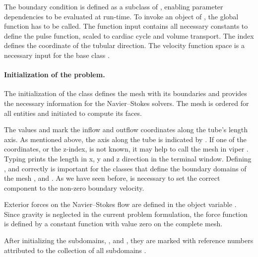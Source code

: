 The boundary condition  is defined as a subclass of
, enabling parameter dependencies to be evaluated at run-time. To invoke an object of , the global function
 has to be called. The function input
contains all necessary constants to define the pulse function, scaled
to cardiac cycle and volume transport. The index 
defines the coordinate of the tubular direction. The velocity
function space  is a necessary input for the base class .

\paragraph{Initialization of the problem.}
The initialization of the class
 defines the mesh with its boundaries and provides the
necessary information for the Navier--Stokes solvers. The mesh is
ordered for all entities and initiated to compute its faces.

The values  and  mark the inflow and outflow
coordinates along the tube's length axis. As mentioned above, the axis
along the tube is indicated by . If one of the
coordinates, or the z-index, is not known, it may help to call the
mesh in viper . Typing  prints the
length in x, y and z direction in the terminal window. Defining
,  and  correctly is important
for the classes that define the boundary domains of the mesh
,  and . As we have seen before,
 is necessary to set the correct component to the
non-zero boundary velocity.

Exterior forces on the Navier--Stokes flow are defined in the object
variable . Since gravity is neglected in the current problem
formulation, the force function  is defined by a constant
function  with value zero on the complete mesh.

After initializing the subdomains, , 
and , they are marked with reference numbers attributed
to the collection of all subdomains .

